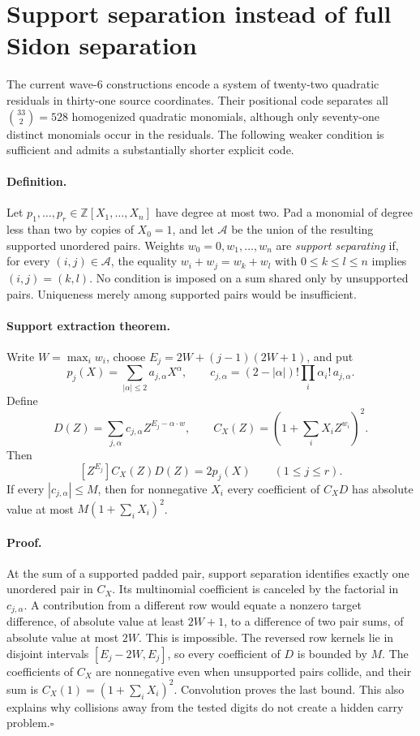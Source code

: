 \section{Support separation instead of full Sidon separation}

The current wave-6 constructions encode a system of twenty-two quadratic
residuals in thirty-one source coordinates.  Their positional code separates
all $\binom{33}{2}=528$ homogenized quadratic monomials, although only
seventy-one distinct monomials occur in the residuals.  The following
weaker condition is sufficient and admits a substantially shorter explicit
code.

\paragraph{Definition.}
Let $p_1,\ldots,p_r\in\mathbb Z[X_1,\ldots,X_n]$ have degree at most two.
Pad a monomial of degree less than two by copies of $X_0=1$, and let
$\mathcal A$ be the union of the resulting supported unordered pairs.
Weights $w_0=0,w_1,\ldots,w_n$ are \emph{support separating} if, for every
$(i,j)\in\mathcal A$, the equality
$w_i+w_j=w_k+w_l$ with $0\le k\le l\le n$ implies $(i,j)=(k,l)$.
No condition is imposed on a sum shared only by unsupported pairs.
Uniqueness merely among supported pairs would be insufficient.

\paragraph{Support extraction theorem.}
Write $W=\max_iw_i$, choose
$E_j=2W+(j-1)(2W+1)$, and put
\[
 p_j(X)=\sum_{|\alpha|\le2}a_{j,\alpha}X^\alpha,\qquad
 c_{j,\alpha}=(2-|\alpha|)!\prod_i\alpha_i!\,a_{j,\alpha}.
\]
Define
\[
 D(Z)=\sum_{j,\alpha}c_{j,\alpha}Z^{E_j-\alpha\cdot w},
 \qquad C_X(Z)=\left(1+\sum_iX_iZ^{w_i}\right)^2.
\]
Then
\[
 [Z^{E_j}]C_X(Z)D(Z)=2p_j(X)\qquad(1\le j\le r).
\]
If every $|c_{j,\alpha}|\le M$, then for nonnegative $X_i$ every
coefficient of $C_XD$ has absolute value at most
$M(1+\sum_iX_i)^2$.

\paragraph{Proof.}
At the sum of a supported padded pair, support separation identifies exactly
one unordered pair in $C_X$. Its multinomial coefficient is canceled by the
factorial in $c_{j,\alpha}$. A contribution from a different row would equate
a nonzero target difference, of absolute value at least $2W+1$, to a
difference of two pair sums, of absolute value at most $2W$. This is
impossible. The reversed row kernels lie in disjoint intervals
$[E_j-2W,E_j]$, so every coefficient of $D$ is bounded by $M$.
The coefficients of $C_X$ are nonnegative even when unsupported pairs
collide, and their sum is $C_X(1)=(1+\sum_iX_i)^2$. Convolution proves the
last bound. This also explains why collisions away from the tested digits
do not create a hidden carry problem.\hfill$\square$

